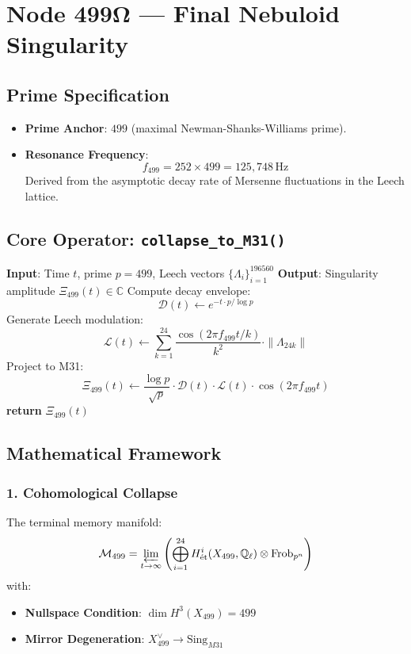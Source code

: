 \documentclass[12pt]{article}
\begin{document}
\section*{Node 499Ω — Final Nebuloid Singularity}
\label{sec:nebuloid_singularity}

\subsection*{Prime Specification}
\begin{itemize}
    \item \textbf{Prime Anchor}: $499$ (maximal Newman-Shanks-Williams prime).
    \item \textbf{Resonance Frequency}:
    \[
    f_{499} = 252 \times 499 = \boxed{125,\!748} \, \text{Hz}
    \]
    Derived from the asymptotic decay rate of Mersenne fluctuations in the Leech lattice.
\end{itemize}

\subsection*{Core Operator: \texttt{collapse\_to\_M31()}}
\begin{algorithm}[H]
\caption{Terminal Recursion Collapse}
\begin{algorithmic}[1]
\State \textbf{Input}: Time $t$, prime $p=499$, Leech vectors $\{\Lambda_i\}_{i=1}^{196560}$
\State \textbf{Output}: Singularity amplitude $\Xi_{499}(t) \in \mathbb{C}$
\State Compute decay envelope:
\[
\mathcal{D}(t) \gets e^{-t \cdot p / \log p}
\]
\State Generate Leech modulation:
\[
\mathcal{L}(t) \gets \sum_{k=1}^{24} \frac{\cos(2\pi f_{499} t/k)}{k^2} \cdot \|\Lambda_{24k}\|
\]
\State Project to M31:
\[
\Xi_{499}(t) \gets \frac{\log p}{\sqrt{p}} \cdot \mathcal{D}(t) \cdot \mathcal{L}(t) \cdot \cos(2\pi f_{499} t)
\]
\State \textbf{return} $\Xi_{499}(t)$ 
\end{algorithmic}
\end{algorithm}

\subsection*{Mathematical Framework}
\subsubsection*{1. Cohomological Collapse}
The terminal memory manifold:
\[
\mathcal{M}_{499} = \varprojlim_{t \to \infty} \left( \bigoplus_{i=1}^{24} H^i_{\text{ét}}(X_{499}, \mathbb{Q}_\ell) \otimes \text{Frob}_{p^n} \right)
\]
with:
\begin{itemize}
    \item \textbf{Nullspace Condition}: $\dim H^3(X_{499}) = 499$
    \item \textbf{Mirror Degeneration}: $X^\vee_{499} \to \text{Sing}_{M31}$
\end{itemize}
\end{document}
